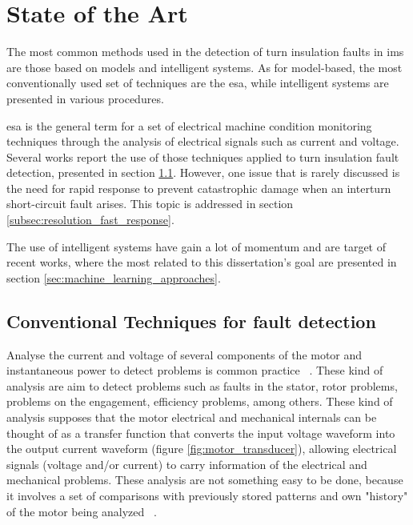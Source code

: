 \chapter{State of the Art}
\label{cha:state_of_the_art}

The most common methods used in the detection of turn insulation faults in \acrshort{ims} are those based on models and intelligent systems. As for model-based, the most conventionally used set of techniques are the \acrfull{esa}, while intelligent systems are presented in various 
procedures.

\acrshort{esa} is the general term for a set of electrical machine condition monitoring techniques through the analysis of electrical signals such as current and voltage. Several works report the use of those techniques applied to turn insulation fault detection, presented in section \ref{sec:conventional_techniques}. However, one issue that is rarely discussed is the need for rapid response to prevent catastrophic damage when an interturn short-circuit fault arises. This topic is addressed in section \ref{subsec:resolution_fast_response}.

The use of intelligent systems have gain a lot of momentum and are target of recent works, where the most related to this dissertation's goal  are presented in section \ref{sec:machine_learning_approaches}.



\section{Conventional Techniques for fault detection} %
\label{sec:conventional_techniques}

Analyse the current and voltage of several components of the motor and instantaneous power to detect problems is common practice ~\cite{Bonaldi2012}. These kind of analysis  are aim to detect problems such as faults in the stator, rotor problems, problems on the engagement, efficiency problems, among others. These kind of analysis supposes that the motor electrical and mechanical internals can be thought of as a transfer function  that converts the input voltage waveform into the output current waveform (figure \ref{fig:motor_transducer}), allowing electrical signals (voltage and/or current) to carry information of the electrical and mechanical problems.
These analysis are not something easy to be done, because it involves a set of comparisons with previously stored patterns and own "history" of the motor being analyzed ~\cite{Bonaldi2012}. 


